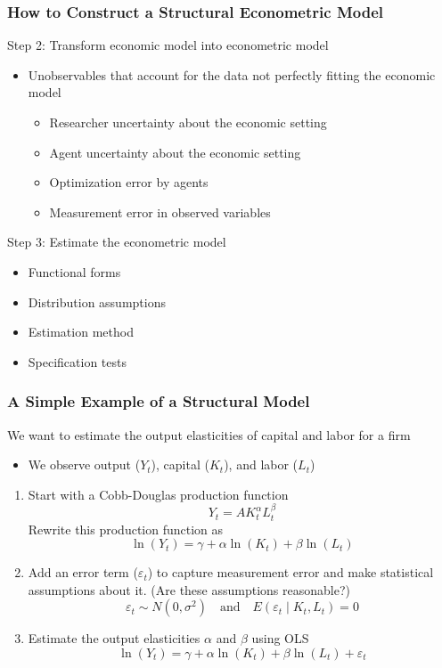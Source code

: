 \documentclass{beamer}
\begin{document}
\begin{frame}\frametitle{How to Construct a Structural Econometric Model}
    Step 2: Transform economic model into econometric model
    \begin{itemize}
        \item Unobservables that account for the data not perfectly fitting the economic model
        \begin{itemize}
            \item Researcher uncertainty about the economic setting
            \item Agent uncertainty about the economic setting
            \item Optimization error by agents
            \item Measurement error in observed variables
        \end{itemize}
    \end{itemize}
    \vspace{2ex}
    Step 3: Estimate the econometric model
    \begin{itemize}
        \item Functional forms
        \item Distribution assumptions
        \item Estimation method
        \item Specification tests
    \end{itemize}
\end{frame}

\begin{frame}\frametitle{A Simple Example of a Structural Model}
    We want to estimate the output elasticities of capital and labor for a firm
    \begin{itemize}
    	\item We observe output ($Y_t$), capital ($K_t$), and labor ($L_t$)
    \end{itemize}
    \vspace{1ex}
    \begin{enumerate}
    	\item Start with a Cobb-Douglas production function
    	$$Y_t = A K_t^\alpha L_t^\beta$$
    	Rewrite this production function as
    	$$\ln(Y_t) = \gamma + \alpha \ln(K_t) + \beta \ln(L_t)$$
    	\item Add an error term ($\varepsilon_t$) to capture measurement error and make statistical assumptions about it. (Are these assumptions reasonable?)\
        $$\varepsilon_t \sim N(0, \sigma^2) \quad \text{and} \quad E(\varepsilon_t \mid K_t, L_t) = 0$$
        \item Estimate the output elasticities $\alpha$ and $\beta$ using OLS
        $$\ln(Y_t) = \gamma + \alpha \ln(K_t) + \beta \ln(L_t) + \varepsilon_t$$
    \end{enumerate}
\end{frame}
\end{document}
